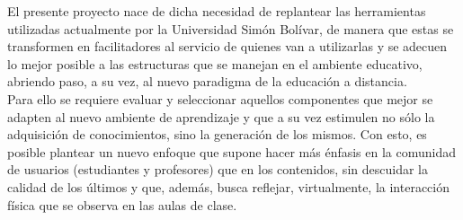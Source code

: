 El presente proyecto nace de dicha necesidad de replantear las herramientas utilizadas actualmente por la Universidad Simón Bolívar, de manera que estas se transformen en facilitadores al servicio de quienes van a utilizarlas y se adecuen lo mejor posible a las estructuras que se manejan en el ambiente educativo, abriendo paso, a su vez, al nuevo paradigma de la educación a distancia.\\

Para ello se requiere evaluar y seleccionar aquellos componentes que mejor se adapten al nuevo ambiente de aprendizaje y que a su vez estimulen no sólo la adquisición de conocimientos, sino la generación de los mismos. Con esto, es posible plantear un nuevo enfoque que supone hacer más énfasis en la comunidad de usuarios (estudiantes y profesores) que en los contenidos, sin descuidar la calidad de los últimos y que, además, busca reflejar, virtualmente, la interacción física que se observa en las aulas de clase.\\